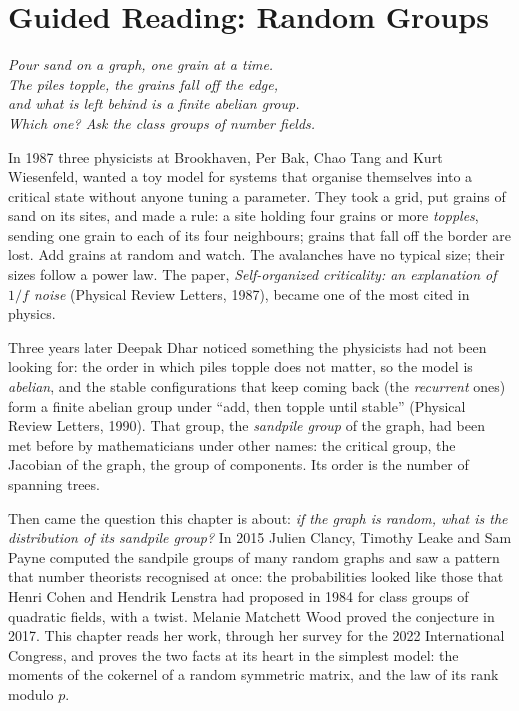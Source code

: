 \chapter{Guided Reading: Random Groups}
\label{ch:sandpiles}

\begin{center}\itshape
Pour sand on a graph, one grain at a time.\\
The piles topple, the grains fall off the edge,\\
and what is left behind is a finite abelian group.\\
Which one? Ask the class groups of number fields.
\end{center}

In 1987 three physicists at Brookhaven, Per Bak, Chao Tang and Kurt Wiesenfeld, wanted a toy model for systems that organise themselves into a critical state without anyone tuning a parameter. They took a grid, put grains of sand on its sites, and made a rule: a site holding four grains or more \emph{topples}, sending one grain to each of its four neighbours; grains that fall off the border are lost. Add grains at random and watch. The avalanches have no typical size; their sizes follow a power law. The paper, \emph{Self-organized criticality: an explanation of $1/f$ noise} (Physical Review Letters, 1987), became one of the most cited in physics.

Three years later Deepak Dhar noticed something the physicists had not been looking for: the order in which piles topple does not matter, so the model is \emph{abelian}, and the stable configurations that keep coming back (the \emph{recurrent} ones) form a finite abelian group under ``add, then topple until stable'' (Physical Review Letters, 1990). That group, the \emph{sandpile group} of the graph, had been met before by mathematicians under other names: the critical group, the Jacobian of the graph, the group of components. Its order is the number of spanning trees.

Then came the question this chapter is about: \emph{if the graph is random, what is the distribution of its sandpile group?} In 2015 Julien Clancy, Timothy Leake and Sam Payne computed the sandpile groups of many random graphs and saw a pattern that number theorists recognised at once: the probabilities looked like those that Henri Cohen and Hendrik Lenstra had proposed in 1984 for class groups of quadratic fields, with a twist. Melanie Matchett Wood proved the conjecture in 2017. This chapter reads her work, through her survey for the 2022 International Congress, and proves the two facts at its heart in the simplest model: the moments of the cokernel of a random symmetric matrix, and the law of its rank modulo $p$.

